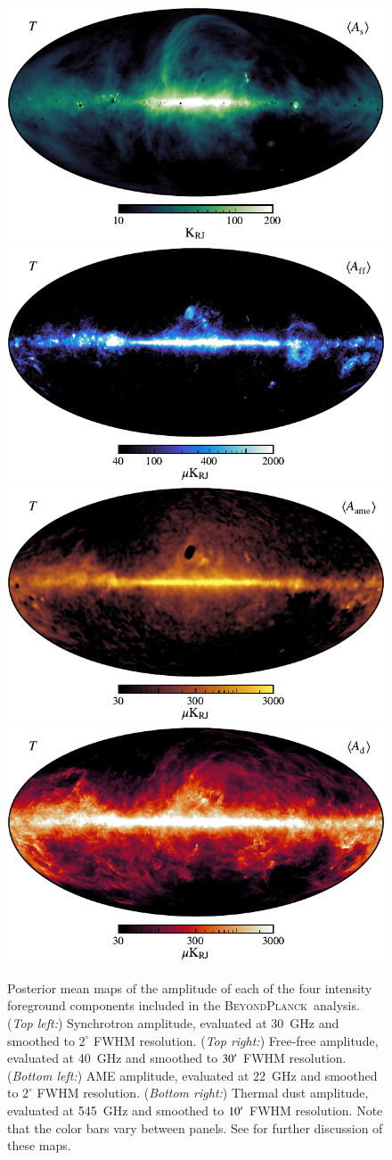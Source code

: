 \documentclass[onecolumn]{aa}
\newcommand{\BP}{\textsc{BeyondPlanck}}
\begin{document}
\begin{figure}[t]
  \center
  \includegraphics[width=0.49\linewidth]{figs/BP_synch_v2_I_MEAN_w12_n1024_cb_c-swamp.pdf}
  \includegraphics[width=0.49\linewidth]{figs/BP_freefree_v2_I_MEAN_w12_n1024_cb_c-freeze.pdf}\\
  \includegraphics[width=0.49\linewidth]{figs/BP_ame_v2_I_MEAN_w12_n1024_cb_c-amber.pdf}
  \includegraphics[width=0.49\linewidth]{figs/BP_dust_v2_I_MEAN_w12_n1024_cb_c-sunburst.pdf}
  \caption{
    Posterior mean maps of the amplitude of each of the four intensity
    foreground components included in the \BP\ analysis. (\emph{Top left:})
    Synchrotron amplitude, evaluated at 30~GHz and smoothed to $2^{\circ}$ FWHM
    resolution.  (\emph{Top right:}) Free-free amplitude, evaluated at 40~GHz
    and smoothed to $30^\prime$ FWHM resolution. (\emph{Bottom left:}) AME
    amplitude, evaluated at 22~GHz and smoothed to $2^{\circ}$ FWHM resolution.
    (\emph{Bottom right:}) Thermal dust amplitude, evaluated at 545~GHz and smoothed to $10^\prime$ FWHM resolution. Note that the color bars vary between panels. See \citet{bp13} for further discussion of these maps.
  }\label{fig:fg_temp}
\end{figure}
\end{document}
